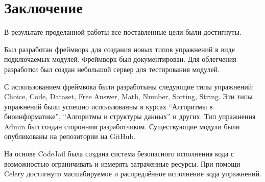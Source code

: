 \documentclass{matmex-diploma-custom}
\begin{document}
\section*{Заключение}
В результате проделанной работы все поставленные цели были
достигнуты.

Был разработан фреймворк для создания новых типов упражнений в виде
подключаемых модулей. Фреймворк был документирован. Для облегчения
разработки был создан небольшой сервер для тестирования модулей.

С использованием фреймвока были разработыны следующие типы упражнений:
Choice, Code, Dataset, Free Answer, Math, Number, Sorting, String. Эти
типы упражнений были успешно использованны в курсах ``Алгоритмы в
биоинформатике'', ``Алгоритмы и структуры данных'' и других. Тип
упражнения Admin был создан сторонним разработчиком. Существующие
модули были опубликованы на репозитории на GitHub.

На основе CodeJail была создана система безопасного исполнения кода с
возможностью ограничивать и измерять затраченные ресурсы. При помощи
Celery достигнуто масшабируемое и распредлённое исполнение кода упражнений.



\end{document}

